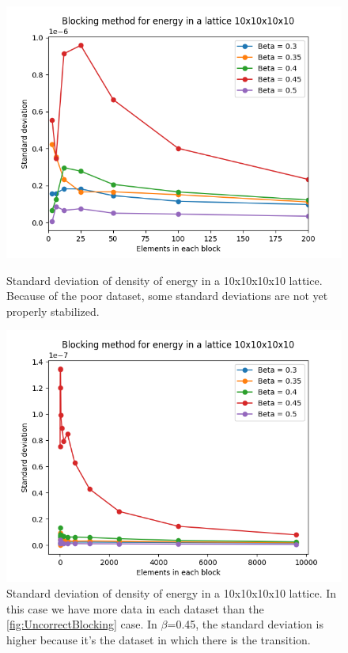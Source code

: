             \begin{figure}[H]
                \centering
                \includegraphics[scale= 0.40]{UncorrectBlocking.png}
                \caption{Standard deviation of density of energy in a 10x10x10x10 lattice. Because of the poor dataset, some standard deviations are not 
                yet properly stabilized.}
                \label{fig:UncorrectBlocking} 
                \includegraphics[scale= 0.40]{CorrectBlocking.png} 
                \caption{Standard deviation of density of energy in a 10x10x10x10 lattice. In this case we have more data in each dataset than the 
                \cref{fig:UncorrectBlocking} case.
                In $\beta$=0.45, the standard deviation is higher because it's the dataset in which there is the transition.}
                \label{fig:CorrectBlocking} 
            \end{figure}

